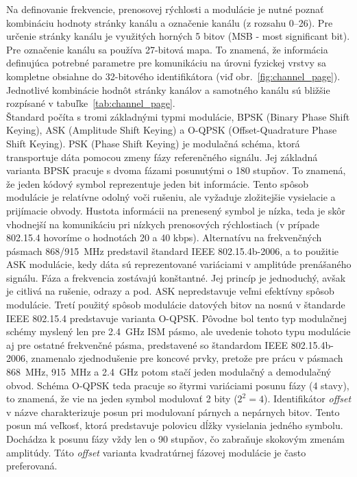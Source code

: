 \indent Na definovanie frekvencie, prenosovej rýchlosti a modulácie je nutné poznať kombináciu hodnoty stránky kanálu a označenie kanálu (z rozsahu 0--26). Pre určenie stránky kanálu je využitých horných 5 bitov (MSB - most significant bit). Pre označenie kanálu sa používa 27-bitová mapa. To znamená, že informácia definujúca potrebné parametre pre komunikáciu na úrovni fyzickej vrstvy sa kompletne obsiahne do 32-bitového identifikátora (viď obr.~\ref{fig:channel_page}). Jednotlivé kombinácie hodnôt stránky kanálov a samotného kanálu sú bližšie rozpísané v tabuľke~\ref{tab:channel_page}.\\
\indent Štandard počíta s tromi základnými typmi modulácie, BPSK (Binary Phase Shift Keying), ASK (Amplitude Shift Keying) a O-QPSK (Offset-Quadrature Phase Shift Keying). PSK (Phase Shift Keying) je modulačná schéma, ktorá transportuje dáta pomocou zmeny fázy referenčného signálu. Jej základná varianta BPSK pracuje s dvoma fázami posunutými o 180 stupňov. To znamená, že jeden kódový symbol reprezentuje jeden bit informácie. Tento spôsob modulácie je relatívne odolný voči rušeniu, ale vyžaduje zložitejšie vysielacie a prijímacie obvody. Hustota informácii na prenesený symbol je nízka, teda je skôr vhodnejší na komunikáciu pri nízkych prenosových rýchlostiach (v prípade 802.15.4 hovoríme o hodnotách 20 a 40 kbps). Alternatívu na frekvenčných pásmach 868/915~MHz predstavil štandard IEEE 802.15.4b-2006, a to použitie ASK modulácie, kedy dáta sú reprezentované variáciami v amplitúde prenášaného signálu. Fáza a frekvencia zostávajú konštantné. Jej princíp je jednoduchý, avšak je citlivá na rušenie, odrazy a pod. ASK nepredstavuje veľmi efektívny spôsob modulácie. Tretí použitý spôsob modulácie datových bitov na nosnú v štandarde IEEE 802.15.4 predstavuje varianta O-QPSK. Pôvodne bol tento typ modulačnej schémy myslený len pre 2.4~GHz ISM pásmo, ale uvedenie tohoto typu modulácie aj pre ostatné frekvenčné pásma, predstavené so štandardom IEEE 802.15.4b-2006, znamenalo zjednodušenie pre koncové prvky, pretože pre prácu v pásmach 868~MHz, 915~MHz a 2.4~GHz potom stačí jeden modulačný a demodulačný obvod. Schéma O-QPSK teda pracuje so štyrmi variáciami posunu fázy (4 stavy), to znamená, že vie na jeden symbol modulovať 2 bity ($2^{2}=4$). Identifikátor \textit{offset} v názve charakterizuje posun pri modulovaní párnych a nepárnych bitov. Tento posun má veľkosť, ktorá predstavuje polovicu dĺžky vysielania jedného symbolu. Dochádza k posunu fázy vždy len o 90 stupňov, čo zabraňuje skokovým zmenám amplitúdy. Táto \textit{offset} varianta kvadratúrnej fázovej modulácie je často preferovaná.\\
